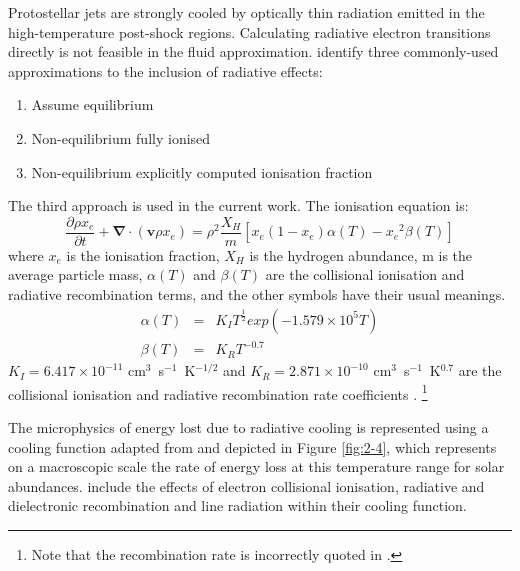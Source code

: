 Protostellar jets are strongly cooled by optically thin radiation emitted in the high-temperature post-shock regions.
Calculating radiative electron transitions directly is not feasible in the fluid approximation.
\citet{1997ApJS..109..517R} identify three commonly-used approximations to the inclusion of radiative effects:
\begin{enumerate}
\item Assume equilibrium \citep{1987ApJ...323..193R}
\item Non-equilibrium fully ionised \citep{1990ApJ...360..370B}
\item Non-equilibrium explicitly computed ionisation fraction \citep{1995MNRAS.272..785F}
\end{enumerate}
The third approach is used in the current work.
The ionisation equation is:
\begin{equation}
\frac{\partial \rho x_e}{\partial t} + \boldsymbol{\nabla} \cdot \left( \mathbf{v} \rho x_e \right)  = {\rho}^2 \frac{X_H}{m}\left[ x_e\left( 1-x_e  \right) \alpha \left( T \right) - {x_{e}}^2 \beta \left(  T \right) \right]
\end{equation}
where 
$x_e$ is the ionisation fraction,
$X_H$ is the hydrogen abundance,
m is the average particle mass,
$\alpha \left( T \right) $
and
$\beta \left( T \right) $
are the collisional ionisation and radiative recombination terms, and the other symbols have their usual meanings.
\begin{eqnarray}
\alpha \left( T \right)& =& K_I T^{\frac{1}{2}} exp \left( -1.579 \times 10^5 T\right) \\
\beta \left( T \right)& = & K_R T^{-0.7}
\end{eqnarray}
$K_I=6.417 \times 10^{-11}$ cm$^3$~s$^{-1}$~K$^{-1/2}$ and $K_R=2.871 \times 10^{-10}$ cm$^3$~s$^{-1}$~K$^{0.7}$ are the collisional ionisation and radiative recombination rate coefficients \citep{1995MNRAS.272..785F}. \footnote{Note that the recombination rate is incorrectly quoted in \citet{1995MNRAS.272..785F}. }

The microphysics of energy lost due to radiative cooling is represented using a
cooling function adapted from \citet{1993ApJS...88..253S} and depicted in Figure
\ref{fig:2-4}, which represents on a macroscopic scale the rate of energy loss at this temperature range for solar abundances.
\citet{1993ApJS...88..253S} include the effects of electron collisional ionisation, radiative and dielectronic recombination and line radiation within their cooling function.

